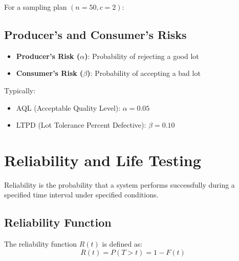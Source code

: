 \documentclass[twoside]{book}
\begin{document}
For a sampling plan $(n=50, c=2)$:

\begin{figure}[H]
\centering
{}
\end{figure}

\subsection{Producer's and Consumer's Risks}

\begin{itemize}
    \item \textbf{Producer's Risk ($\alpha$)}: Probability of rejecting a good lot
    \item \textbf{Consumer's Risk ($\beta$)}: Probability of accepting a bad lot
\end{itemize}

Typically:
\begin{itemize}
    \item AQL (Acceptable Quality Level): $\alpha = 0.05$
    \item LTPD (Lot Tolerance Percent Defective): $\beta = 0.10$
\end{itemize}

\section{Reliability and Life Testing}

Reliability is the probability that a system performs successfully during a specified time interval under specified conditions.

\subsection{Reliability Function}

The reliability function $R(t)$ is defined as:
$$R(t) = P(T > t) = 1 - F(t)$$
\end{document}
